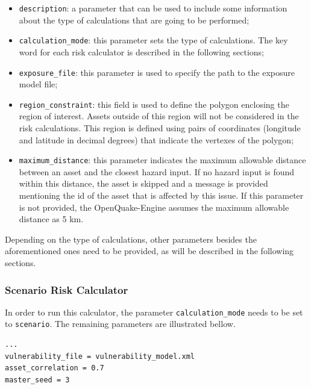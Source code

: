 \begin{itemize}
\item  \Verb+description+: a parameter that can be used to include some information about the type of calculations that are going to be performed;
\item  \Verb+calculation_mode+: this parameter sets the type of calculations. The key word for each risk calculator is described in the following sections;
\item  \Verb+exposure_file+: this parameter is used to specify the path to the \gls{exposure model} file;
\item  \Verb+region_constraint+: this field is used to define the polygon enclosing the region of interest. Assets outside of this region will not be considered in the risk calculations. This region is defined using pairs of coordinates (longitude and latitude in decimal degrees) that indicate the vertexes of the polygon;
\item  \Verb+maximum_distance+: this parameter indicates the maximum allowable distance between an \gls{asset} and the closest hazard input. If no hazard input is found within this distance, the \gls{asset} is skipped and a message is provided mentioning the id of the asset that is affected by this issue. If this parameter is not provided, the OpenQuake-Engine assumes the maximum allowable distance as 5 km.
\end{itemize}

Depending on the type of calculations, other parameters besides the aforementioned ones need to be provided, as will be described in the following sections.

\subsubsection{Scenario Risk Calculator}
In order to run this calculator, the parameter \Verb+calculation_mode+ needs to be set to \Verb+scenario+. The remaining parameters are illustrated bellow.

\begin{Verbatim}[frame=single, commandchars=\\\{\}, samepage=true]
...
vulnerability_file = vulnerability_model.xml
asset_correlation = 0.7
master_seed = 3
\end{Verbatim}

